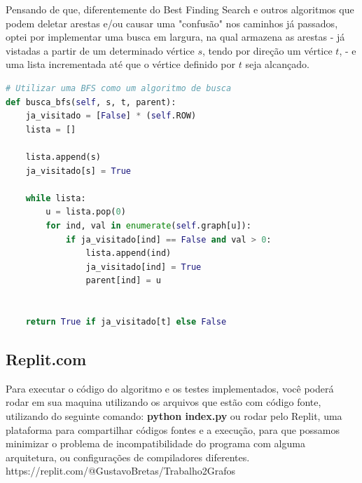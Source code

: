 Pensando de que, diferentemente do Best Finding Search e outros algoritmos que podem deletar arestas e/ou causar uma "confusão" nos caminhos já passados, optei por implementar uma busca em largura, na qual armazena as arestas -  já vistadas a partir de um determinado vértice $s$, tendo por direção um vértice $t$, - e uma lista incrementada até que o vértice definido por $t$ seja alcançado.

\begin{scriptsize}
\estiloJava
\begin{lstlisting}[title={Algoritmo BFS}, label=lst:javacode, language=Python]
# Utilizar uma BFS como um algoritmo de busca
def busca_bfs(self, s, t, parent):
    ja_visitado = [False] * (self.ROW)
    lista = []

    lista.append(s)
    ja_visitado[s] = True

    while lista:
        u = lista.pop(0)
        for ind, val in enumerate(self.graph[u]):
            if ja_visitado[ind] == False and val > 0:
                lista.append(ind)
                ja_visitado[ind] = True
                parent[ind] = u


    return True if ja_visitado[t] else False
\end{lstlisting}
\end{scriptsize}

\subsection{Replit.com}
Para executar o código do algoritmo e os testes implementados, você poderá rodar em sua maquina utilizando os arquivos que estão com código fonte, utilizando do seguinte comando: \textbf{python index.py} ou rodar pelo Replit, uma plataforma para compartilhar códigos fontes e a execução, para que possamos minimizar o problema de incompatibilidade do programa com alguma arquitetura, ou configurações de compiladores diferentes. 
\\
https://replit.com/@GustavoBretas/Trabalho2Grafos